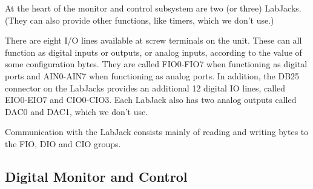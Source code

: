\documentclass[letterpaper,11pt]{book}
\begin{document}
At the heart of the monitor and control subsystem are two (or three) 
LabJacks.  (They can also provide other functions, like timers,
which we don't use.)

There are eight I/O lines available at screw terminals on the unit. These can
all function as digital inputs or outputs, or analog inputs, according to the
value of some configuration bytes.  They are called FIO0-FIO7 when functioning
as digital ports and AIN0-AIN7 when functioning as analog ports.  In addition,
the DB25 connector on the LabJacks provides an additional 12 digital IO lines,
called EIO0-EIO7 and CIO0-CIO3.  Each LabJack also has two analog
outputs called DAC0 and DAC1, which we don't use.

Communication with the LabJack consists mainly of reading and writing bytes to
the FIO, DIO and CIO groups.


\subsection{Digital Monitor and Control}
\end{document}
